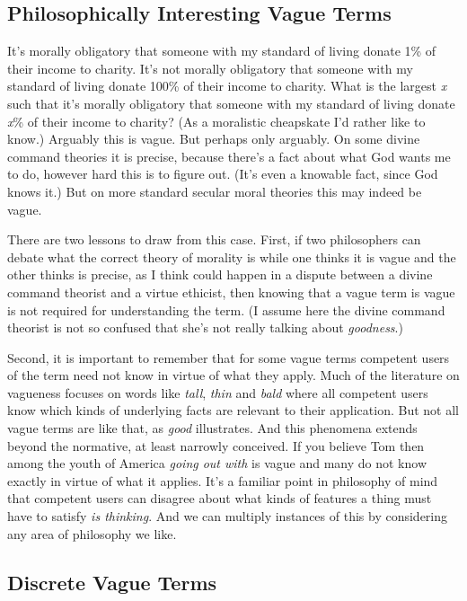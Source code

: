 \subsection{Philosophically Interesting Vague Terms}

It's morally obligatory that someone with my standard of living donate 1\% of their income to charity. It's not morally obligatory that someone with my standard of living donate 100\% of their income to charity. What is the largest \textit{x} such that it's morally obligatory that someone with my standard of living donate \textit{x}\% of their income to charity? (As a moralistic cheapskate I'd rather like to know.) Arguably this is vague. But perhaps only arguably. On some divine command theories it is precise, because there's a fact about what God wants me to do, however hard this is to figure out. (It's even a knowable fact, since God knows it.) But on more standard secular moral theories this may indeed be vague. 

There are two lessons to draw from this case. First, if two philosophers can debate what the correct theory of morality is while one thinks it is vague and the other thinks is precise, as I think could happen in a dispute between a divine command theorist and a virtue ethicist, then knowing that a vague term is vague is not required for understanding the term. (I assume here the divine command theorist is not so confused that she's not really talking about \textit{goodness}.) 

Second, it is important to remember that for some vague terms competent users of the term need not know in virtue of what they apply. Much of the literature on vagueness focuses on words like \textit{tall}, \textit{thin} and \textit{bald} where all competent users know which kinds of underlying facts are relevant to their application. But not all vague terms are like that, as \textit{good} illustrates. And this phenomena extends beyond the normative, at least narrowly conceived. If you believe Tom \citet{Wolfe2000} then among the youth of America \textit{going out with} is vague and many do not know exactly in virtue of what it applies. It's a familiar point in philosophy of mind that competent users can disagree about what kinds of features a thing must have to satisfy \textit{is thinking}. And we can multiply instances of this by considering any area of philosophy we like.

\subsection{Discrete Vague Terms}

